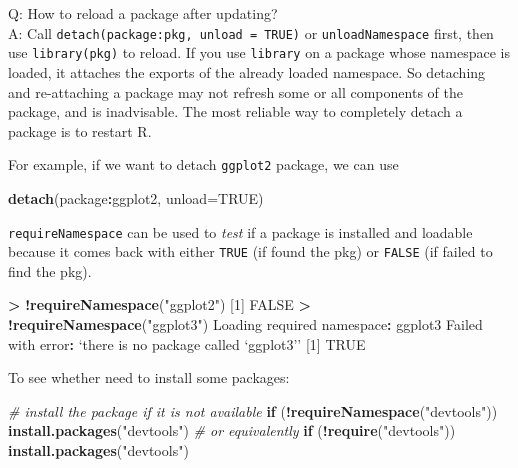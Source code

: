 \documentclass[
  a4paper,
  twoside,
  openright]{book}
\newenvironment{Shaded}{\begin{snugshade}}{\end{snugshade}}
\newcommand{\AttributeTok}[1]{\textcolor[rgb]{0.13,0.29,0.53}{#1}}
\newcommand{\CommentTok}[1]{\textcolor[rgb]{0.56,0.35,0.01}{\textit{#1}}}
\newcommand{\ConstantTok}[1]{\textcolor[rgb]{0.56,0.35,0.01}{#1}}
\newcommand{\ControlFlowTok}[1]{\textcolor[rgb]{0.13,0.29,0.53}{\textbf{#1}}}
\newcommand{\DecValTok}[1]{\textcolor[rgb]{0.00,0.00,0.81}{#1}}
\newcommand{\FunctionTok}[1]{\textcolor[rgb]{0.13,0.29,0.53}{\textbf{#1}}}
\newcommand{\NormalTok}[1]{#1}
\newcommand{\SpecialCharTok}[1]{\textcolor[rgb]{0.81,0.36,0.00}{\textbf{#1}}}
\newcommand{\StringTok}[1]{\textcolor[rgb]{0.31,0.60,0.02}{#1}}
\theoremstyle{definition}
\theoremstyle{definition}
\theoremstyle{definition}
\theoremstyle{definition}
\theoremstyle{remark}
\begin{document}
Q: How to reload a package after updating?\\
A: Call \texttt{detach(package:pkg,\ unload\ =\ TRUE)} or \texttt{unloadNamespace} first, then use \texttt{library(pkg)} to reload. If you use \texttt{library} on a package whose namespace is loaded, it attaches the exports of the already loaded namespace. So detaching and re-attaching a package may not refresh some or all components of the package, and is inadvisable. The most reliable way to completely detach a package is to {restart R}.

For example, if we want to detach \texttt{ggplot2} package, we can use

\begin{Shaded}
\begin{Highlighting}[]
\FunctionTok{detach}\NormalTok{(package}\SpecialCharTok{:}\NormalTok{ggplot2, }\AttributeTok{unload=}\ConstantTok{TRUE}\NormalTok{)}
\end{Highlighting}
\end{Shaded}

\texttt{requireNamespace} can be used to \emph{test} if a package is installed and loadable because it comes back with either \texttt{TRUE} (if found the pkg) or \texttt{FALSE} (if failed to find the pkg).

\begin{Shaded}
\begin{Highlighting}[]
\SpecialCharTok{\textgreater{}} \SpecialCharTok{!}\FunctionTok{requireNamespace}\NormalTok{(}\StringTok{"ggplot2"}\NormalTok{)}
\NormalTok{[}\DecValTok{1}\NormalTok{] }\ConstantTok{FALSE}
\SpecialCharTok{\textgreater{}} \SpecialCharTok{!}\FunctionTok{requireNamespace}\NormalTok{(}\StringTok{"ggplot3"}\NormalTok{)}
\NormalTok{Loading required namespace}\SpecialCharTok{:}\NormalTok{ ggplot3}
\NormalTok{Failed with error}\SpecialCharTok{:}\NormalTok{  ‘there is no package called ‘ggplot3’’}
\NormalTok{[}\DecValTok{1}\NormalTok{] }\ConstantTok{TRUE}
\end{Highlighting}
\end{Shaded}

To see whether need to install some packages:

\begin{Shaded}
\begin{Highlighting}[]
\CommentTok{\# install the package if it is not available}
\ControlFlowTok{if}\NormalTok{ (}\SpecialCharTok{!}\FunctionTok{requireNamespace}\NormalTok{(}\StringTok{"devtools"}\NormalTok{)) }\FunctionTok{install.packages}\NormalTok{(}\StringTok{"devtools"}\NormalTok{)}
\CommentTok{\# or equivalently}
\ControlFlowTok{if}\NormalTok{ (}\SpecialCharTok{!}\FunctionTok{require}\NormalTok{(}\StringTok{"devtools"}\NormalTok{)) }\FunctionTok{install.packages}\NormalTok{(}\StringTok{"devtools"}\NormalTok{)}
\end{Highlighting}
\end{Shaded}
\end{document}
